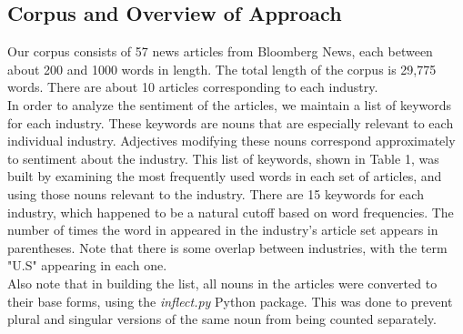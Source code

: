 \documentclass[pageno]{jpaper}
\begin{document}
\subsection{Corpus and Overview of Approach}
\indent Our corpus consists of 57 news articles from Bloomberg News, each between about 200 and 1000 words in length. The total length of the corpus is 29,775 words. There are about 10 articles corresponding to each industry. \\
\indent In order to analyze the sentiment of the articles, we maintain a list of keywords for each industry. These keywords are nouns that are especially relevant to each individual industry. Adjectives modifying these nouns correspond approximately to sentiment about the industry. This list of keywords, shown in Table 1, was built by examining the most frequently used words in each set of articles, and using those nouns relevant to the industry. There are 15 keywords for each industry, which happened to be a natural cutoff based on word frequencies. The number of times the word in appeared in the industry's article set appears in parentheses. Note that there is some overlap between industries, with the term "U.S" appearing in  each one. \\
\indent Also note that in building the list, all nouns in the articles were converted to their base forms, using the \textit{inflect.py} Python package. This was done to prevent plural and singular versions of the same noun from being counted separately.
\end{document}
